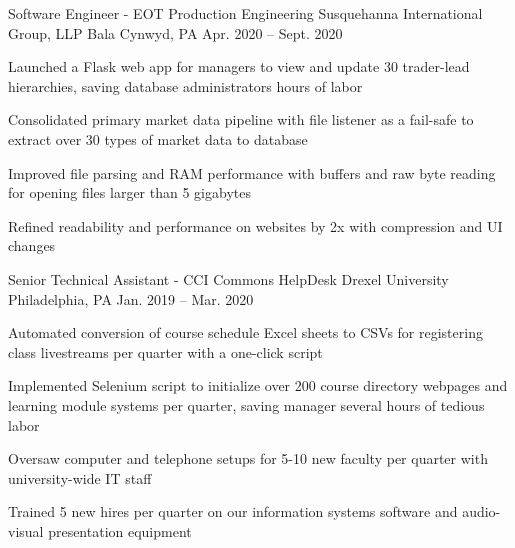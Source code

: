 

\begin{cventries}

  \cventry
  {Software Engineer - EOT Production Engineering} %
  {Susquehanna International Group, LLP} %
  {Bala Cynwyd, PA} %
  {Apr. 2020 -- Sept. 2020} %
  {
    \begin{cvitems} %
      \item {Launched a Flask web app for managers to view and update 30 trader-lead hierarchies, saving database administrators hours of labor}
      \item {Consolidated primary market data pipeline with file listener as a fail-safe to extract over 30 types of market data to database}
      \item {Improved file parsing and RAM performance with buffers and raw byte reading for opening files larger than 5 gigabytes}
      \item {Refined readability and performance on websites by 2x with compression and UI changes}
    \end{cvitems}
  }

  \cventry
  {Senior Technical Assistant - CCI Commons HelpDesk} %
  {Drexel University} %
  {Philadelphia, PA} %
  {Jan. 2019 -- Mar. 2020} %
  {
    \begin{cvitems} %
      \item {Automated conversion of course schedule Excel sheets to CSVs for registering class livestreams per quarter with a one-click script}
      \item {Implemented Selenium script to initialize over 200 course directory webpages and learning module systems per quarter, saving manager several hours of tedious labor}
      \item {Oversaw computer and telephone setups for 5-10 new faculty per quarter with university-wide IT staff}
      \item {Trained 5 new hires per quarter on our information systems software and audio-visual presentation equipment}
    \end{cvitems}
  }

\end{cventries}
